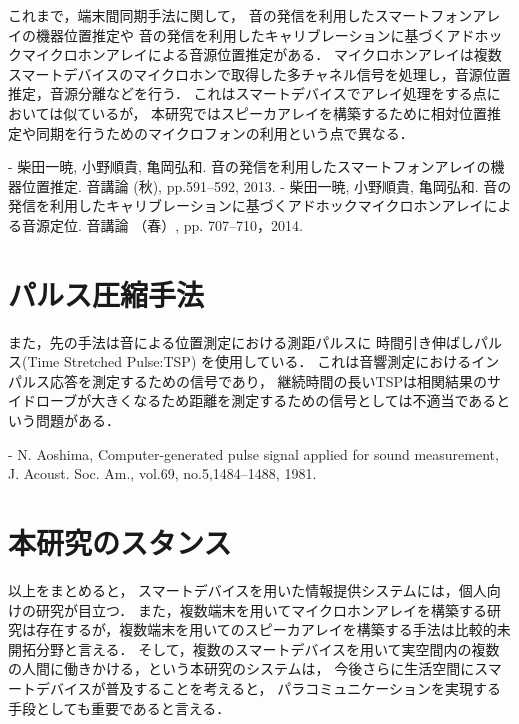これまで，端末間同期手法に関して，
音の発信を利用したスマートフォンアレイの機器位置推定や
音の発信を利用したキャリブレーションに基づくアドホックマイクロホンアレイによる音源位置推定がある．
マイクロホンアレイは複数スマートデバイスのマイクロホンで取得した多チャネル信号を処理し，音源位置推定，音源分離などを行う．
これはスマートデバイスでアレイ処理をする点においては似ているが，
本研究ではスピーカアレイを構築するために相対位置推定や同期を行うためのマイクロフォンの利用という点で異なる．

- 柴田一暁, 小野順貴, 亀岡弘和. 音の発信を利用したスマートフォンアレイの機器位置推定. 音講論 (秋), pp.591--592, 2013.
- 柴田一暁, 小野順貴, 亀岡弘和. 音の発信を利用したキャリブレーションに基づくアドホックマイクロホンアレイによる音源定位. 音講論 （春）, pp. 707--710，2014.


\section{パルス圧縮手法}
また，先の手法は音による位置測定における測距パルスに
時間引き伸ばしパルス(Time Stretched Pulse:TSP) を使用している．
これは音響測定におけるインパルス応答を測定するための信号であり，
継続時間の長いTSPは相関結果のサイドローブが大きくなるため距離を測定するための信号としては不適当であるという問題がある．

- N. Aoshima, Computer-generated pulse signal applied for sound measurement, J. Acoust. Soc. Am., vol.69, no.5,1484--1488, 1981.


\section{本研究のスタンス}
以上をまとめると，
スマートデバイスを用いた情報提供システムには，個人向けの研究が目立つ．
また，複数端末を用いてマイクロホンアレイを構築する研究は存在するが，複数端末を用いてのスピーカアレイを構築する手法は比較的未開拓分野と言える．
そして，複数のスマートデバイスを用いて実空間内の複数の人間に働きかける，という本研究のシステムは，
今後さらに生活空間にスマートデバイスが普及することを考えると，
パラコミュニケーションを実現する手段としても重要であると言える．


